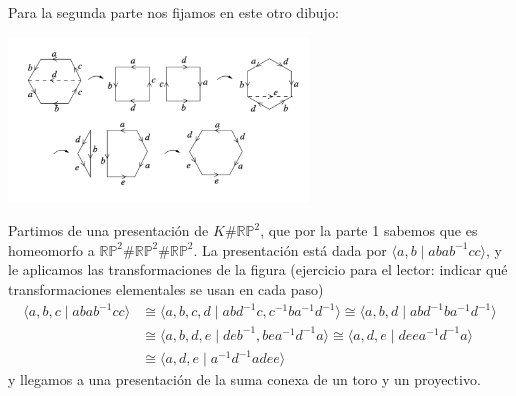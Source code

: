 {    Para la segunda parte nos fijamos en este otro dibujo:
    \begin{center}
        \includegraphics[width=0.6\textwidth]{img/toro-proyectivo-transformacion.png}
    \end{center}
    Partimos de una presentación de $K\#\mathbb{RP}^2$, que por la parte 1 sabemos que es homeomorfo a $\mathbb{RP}^2\#\mathbb{RP}^2\#\mathbb{RP}^2$. La presentación está dada por $\langle a,b\mid abab^{-1}cc \rangle$, y le aplicamos las transformaciones de la figura (ejercicio para el lector: indicar qué transformaciones elementales se usan en cada paso)
    \begin{align*}
        \langle a,b,c\mid abab^{-1}cc \rangle &\cong \langle a,b,c,d\mid abd^{-1}c, c^{-1}ba^{-1}d^{-1} \rangle \cong \langle a,b,d\mid abd^{-1}ba^{-1}d^{-1} \rangle \\
        &\cong \langle a,b,d,e\mid deb^{-1},bea^{-1}d^{-1}a \rangle \cong \langle a,d,e \mid deea^{-1}d^{-1}a \rangle\\
        &\cong \langle a,d,e \mid a^{-1}d^{-1}adee \rangle
    \end{align*}
    y llegamos a una presentación de la suma conexa de un toro y un proyectivo.
}

